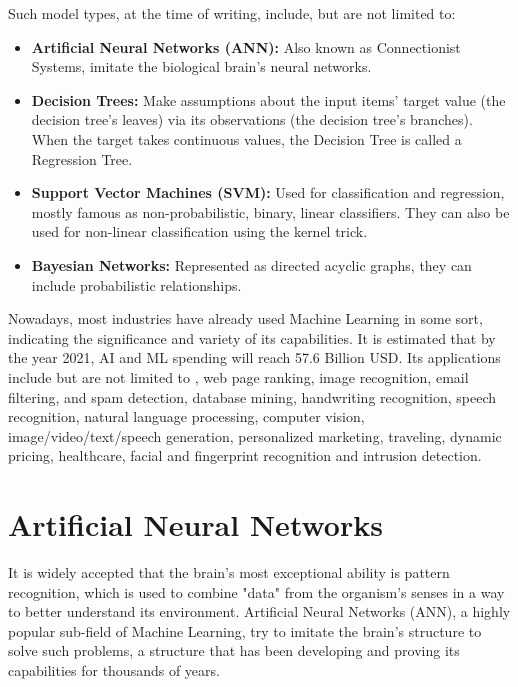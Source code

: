 Such model types, at the time of writing, include, but are not limited to:
\begin{itemize}
	\item \textbf{Artificial Neural Networks (ANN):} Also known as Connectionist Systems, imitate the biological brain's neural networks.
	\item \textbf{Decision Trees:} Make assumptions about the input items' target value (the decision tree's leaves) via its observations (the decision tree's branches). When the target takes continuous values, the Decision Tree is called a Regression Tree.
	\item \textbf{Support Vector Machines (SVM):} Used for classification and regression, most\-ly famous as non-probabilistic, binary, linear classifiers. They can also be used for non-linear classification using the kernel trick.
	\item \textbf{Bayesian Networks:} Represented as directed acyclic graphs, they can include probabilistic relationships.
\end{itemize}

Nowadays, most industries have already used Machine Learning in some sort, indicating the significance and variety of its capabilities. It is estimated \cite{Machine-Learning-Applications} that by the year 2021, AI and ML spending will reach 57.6 Billion USD. Its applications include but are not limited to \cite{Top-Machine-Learning-Applications-in-2019} \cite{Roundup-Of-Machine-Learning-Forecasts-And-Market-Estimates}, web page ranking, image recognition, email filtering, and spam detection, database mining, handwriting recognition, speech recognition, natural language processing, computer vision, image/video/text/speech generation, personalized marketing, traveling, dynamic pricing, healthcare, facial and fingerprint recognition and intrusion detection.

\section{Artificial Neural Networks}
It is widely accepted that the brain's most exceptional ability is pattern recognition, which is used to combine "data" from the organism's senses in a way to better understand its environment. Artificial Neural Networks (ANN), a highly popular sub-field of Machine Learning, try to imitate the brain's structure to solve such problems, a structure that has been developing and proving its capabilities for thousands of years.

